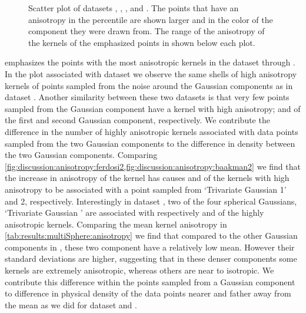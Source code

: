 \begin{figure}
\begin{subfigure}{0.23\textwidth}
					\caption{}
					\label{fig:discussion:anisotropy:baakman3}
				\end{subfigure}			
				\caption{Scatter plot of datasets
					 \ferdosiTwo, %
					 \baakmanTwo, %
					 \ferdosiThree, and %
					 \baakmanThree. %
					The points that have an anisotropy in the  percentile are shown larger and in the color of the component they were drawn from. The range of the anisotropy of the kernels of the emphasized points in shown below each plot.}
				\label{fig:discussion:anisotropy:multisphere}
			\end{figure}			
			 emphasizes the points with the most anisotropic kernels in the dataset \ferdosiTwo through \baakmanThree. 
				In the plot associated with dataset \ferdosiTwo we observe the same shells of high anisotropy kernels of points sampled from the noise around the Gaussian components as in dataset \ferdosiOne. Another similarity between these two datasets is that very few points sampled from the Gaussian component have a kernel with high anisotropy;  and  of the first and second Gaussian component, respectively. 
				We contribute the difference in the number of highly anisotropic kernels associated with data points sampled from the two Gaussian components to the difference in density between the two Gaussian components.
				Comparing \cref{fig:discussion:anisotropy:ferdosi2,fig:discussion:anisotropy:baakman2} we find that the increase in anisotropy of the kernel has causes  and  of the kernels with high anisotropy to be associated with a point sampled from `Trivariate Gaussian 1' and 2, respectively. 
				Interestingly in dataset \ferdosiThree, two of the four spherical Gaussians, \ie `Trivariate Gaussian ' are associated with respectively  and  of the highly anisotropic kernels.
				Comparing the mean kernel anisotropy in \cref{tab:results:multiSphere:anisotropy} we find that compared to the other Gaussian components in \ferdosiThree, these two component have a relatively low mean. However their standard deviations are higher, suggesting that in these denser components some kernels are extremely anisotropic, whereas others are near to isotropic. We contribute this difference within the points sampled from a Gaussian component to difference in physical density of the data points nearer and father away from the mean as we did for dataset \ferdosiOne and \baakmanOne.
